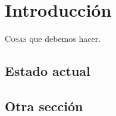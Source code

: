 \chapter{Introducción}

\lettrine{C}{osas} que debemos hacer.\lipsum

\section{Estado actual}
\lipsum

\section{Otra sección}

\lipsum
